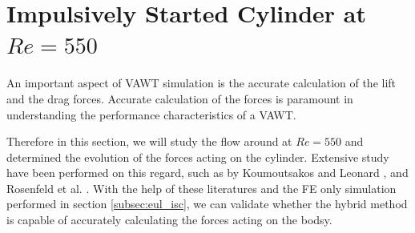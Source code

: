 






\section{Impulsively Started Cylinder at $Re=550$}
\label{sec:vvhm-isc}

An important aspect of VAWT simulation is the accurate calculation of the lift and the drag forces. Accurate calculation of the forces is paramount in understanding the performance characteristics of a VAWT.

Therefore in this section, we will study the flow around  at $Re=550$ and determined the evolution of the forces acting on the cylinder. Extensive study have been performed on this regard, such as by Koumoutsakos and Leonard \cite{Koumoutsakos1995a}, and Rosenfeld et al. \cite{MosheRosenFeldDochanKwak1991}. With the help of these literatures and the FE only simulation performed in section \ref{subsec:eul_isc}, we can validate whether the hybrid method is capable of accurately calculating the forces acting on the bodsy.

